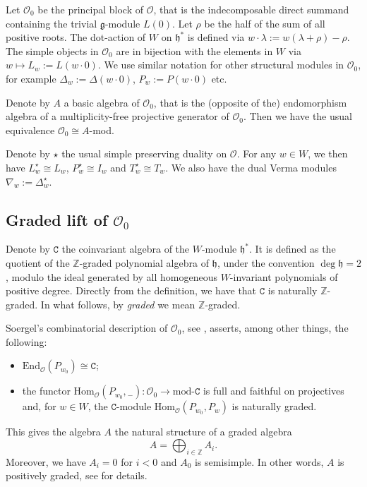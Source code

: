 \documentclass[a4paper]{amsart}
\begin{document}
Let $\mathcal{O}_0$ be the  principal block of $\mathcal{O}$, that is the indecomposable 
direct summand containing the trivial $\mathfrak{g}$-module $L(0)$. Let $\rho$  be the half 
of the sum of all  positive roots. The dot-action of $W$ on $\mathfrak{h}^*$ is defined
via $w\cdot\lambda:=w(\lambda+\rho)-\rho$. The simple objects in $\mathcal{O}_0$ are in bijection
with the elements in $W$ via $w\mapsto L_w:=L(w\cdot 0)$. We use similar notation for other
structural modules in $\mathcal{O}_0$, for example $\Delta_w:=\Delta(w\cdot 0)$,
$P_w:=P(w\cdot 0)$ etc.

Denote by $A$ a basic algebra of $\mathcal{O}_0$, that is the (opposite of the) 
endomorphism algebra of  a multiplicity-free projective generator of $\mathcal{O}_0$.
Then we have the usual equivalence $\mathcal{O}_0\cong A$-mod.

Denote by $\star$ the usual simple preserving duality on $\mathcal{O}$. For any
$w\in W$, we then have $L_w^\star\cong L_w$, $P_w^\star\cong I_w$ and $T_w^\star\cong T_w$.
We also have the dual Verma modules  $\nabla_w:=\Delta_w^\star$.

\subsection{Graded lift of $\mathcal{O}_0$}\label{s5.2}

Denote by $\mathtt{C}$ the coinvariant algebra of the $W$-module $\mathfrak{h}^*$.
It is defined as the quotient of the $\mathbb{Z}$-graded polynomial algebra of $\mathfrak{h}$,
under the convention $\deg \mathfrak{h}=2$, modulo the ideal generated by 
all homogeneous $W$-invariant polynomials of positive degree. Directly from the 
definition, we have that $\mathtt{C}$ is naturally $\mathbb{Z}$-graded.
In what follows, by {\em graded} we mean $\mathbb{Z}$-graded.

Soergel's combinatorial description of $\mathcal{O}_0$, see \cite{So}, asserts,
among other things, the following:
\begin{itemize}
\item $\mathrm{End}_{\mathcal{O}}(P_{w_0})\cong\mathtt{C}$;
\item the functor $\mathrm{Hom}_{\mathcal{O}}(P_{w_0},{}_-):\mathcal{O}_0\to
\mathrm{mod}\text{-}\mathtt{C}$ is full and faithful on projectives and,
for $w\in W$, the $\mathtt{C}$-module $\mathrm{Hom}_{\mathcal{O}}(P_{w_0},P_w)$
is naturally graded.
\end{itemize}
This gives the algebra $A$ the natural structure of a graded algebra
\begin{displaymath}
A=\bigoplus_{i\in\mathbb{Z}}A_i. 
\end{displaymath}
Moreover, we have $A_i=0$ for $i<0$ and $A_0$ is semisimple. In other words, 
$A$ is positively graded, see \cite{So,St} for details.
\end{document}
